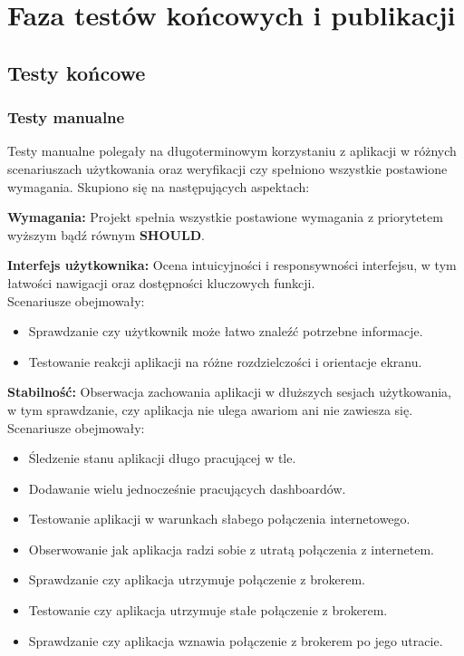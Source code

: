 \section{Faza testów końcowych i publikacji}

\subsection{Testy końcowe}
\subsubsection{Testy manualne}
Testy manualne polegały na długoterminowym korzystaniu z aplikacji w różnych scenariuszach użytkowania oraz weryfikacji czy spełniono wszystkie postawione wymagania. Skupiono się na następujących aspektach:\\

\hspace{3em}

\textbf{Wymagania:} Projekt spełnia wszystkie postawione wymagania z priorytetem wyższym bądź równym \textbf{SHOULD}.\\

\hspace{3em}

\textbf{Interfejs użytkownika:} Ocena intuicyjności i responsywności interfejsu, w tym łatwości nawigacji oraz dostępności kluczowych funkcji.\\

Scenariusze obejmowały:

\begin{itemize}[leftmargin=*]
    \item Sprawdzanie czy użytkownik może łatwo znaleźć potrzebne informacje.
    \item Testowanie reakcji aplikacji na różne rozdzielczości i orientacje ekranu.
\end{itemize}

\hspace{3em}

\textbf{Stabilność:} Obserwacja zachowania aplikacji w dłuższych sesjach użytkowania, w tym sprawdzanie, czy aplikacja nie ulega awariom ani nie zawiesza się.\\

Scenariusze obejmowały:

\begin{itemize}[leftmargin=*]
    \item Śledzenie stanu aplikacji długo pracującej w tle.
    \item Dodawanie wielu jednocześnie pracujących dashboardów.
    \item Testowanie aplikacji w warunkach słabego połączenia internetowego.
    \item Obserwowanie jak aplikacja radzi sobie z utratą połączenia z internetem.
    \item Sprawdzanie czy aplikacja utrzymuje połączenie z brokerem.
    \item Testowanie czy aplikacja utrzymuje stałe połączenie z brokerem.
    \item Sprawdzanie czy aplikacja wznawia połączenie z brokerem po jego utracie.
\end{itemize}

